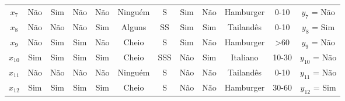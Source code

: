 \begin{center}
\begin{adjustbox}{max width=\textwidth}
\begin{tabular}{|cccccccccccc|}
        \multicolumn{1}{|c|}{${x_7}$}                     & \multicolumn{1}{|c|}{Não}          & \multicolumn{1}{|c|}{Sim} & \multicolumn{1}{|c|}{Não}         & \multicolumn{1}{|c|}{Não}  & \multicolumn{1}{|c|}{Ninguém}  & \multicolumn{1}{|c|}{S}     & \multicolumn{1}{|c|}{Sim}   & \multicolumn{1}{|c|}{Não}     & \multicolumn{1}{|c|}{Hamburger}  & \multicolumn{1}{|c|}{0-10}        & \multicolumn{1}{|c|}{$y_7$ = Não}                     \\ 
        \multicolumn{1}{|c|}{${x_8}$}                     & \multicolumn{1}{|c|}{Não}          & \multicolumn{1}{|c|}{Não} & \multicolumn{1}{|c|}{Não}         & \multicolumn{1}{|c|}{Sim}  & \multicolumn{1}{|c|}{Alguns}   & \multicolumn{1}{|c|}{SS}    & \multicolumn{1}{|c|}{Sim}   & \multicolumn{1}{|c|}{Sim}     & \multicolumn{1}{|c|}{Tailandês}  & \multicolumn{1}{|c|}{0-10}        & \multicolumn{1}{|c|}{$y_8$ = Sim}                     \\ 
        \multicolumn{1}{|c|}{${x_9}$}                     & \multicolumn{1}{|c|}{Não}          & \multicolumn{1}{|c|}{Sim} & \multicolumn{1}{|c|}{Sim}         & \multicolumn{1}{|c|}{Não}  & \multicolumn{1}{|c|}{Cheio}    & \multicolumn{1}{|c|}{S}     & \multicolumn{1}{|c|}{Sim}   & \multicolumn{1}{|c|}{Não}     & \multicolumn{1}{|c|}{Hamburger}  & \multicolumn{1}{|c|}{>60}         & \multicolumn{1}{|c|}{$y_9$ = Não}                     \\ 
        \multicolumn{1}{|c|}{${x_{10}}$}                    & \multicolumn{1}{|c|}{Sim}          & \multicolumn{1}{|c|}{Sim} & \multicolumn{1}{|c|}{Sim}         & \multicolumn{1}{|c|}{Sim}  & \multicolumn{1}{|c|}{Cheio}    & \multicolumn{1}{|c|}{SSS}   & \multicolumn{1}{|c|}{Não}   & \multicolumn{1}{|c|}{Sim}     & \multicolumn{1}{|c|}{Italiano}   & \multicolumn{1}{|c|}{10-30}       & \multicolumn{1}{|c|}{$y_{10}$ = Não}                  \\ 
        \multicolumn{1}{|c|}{$x_{11}$}                    & \multicolumn{1}{|c|}{Não}          & \multicolumn{1}{|c|}{Não} & \multicolumn{1}{|c|}{Não}         & \multicolumn{1}{|c|}{Não}  & \multicolumn{1}{|c|}{Ninguém}  & \multicolumn{1}{|c|}{S}     & \multicolumn{1}{|c|}{Não}   & \multicolumn{1}{|c|}{Não}     & \multicolumn{1}{|c|}{Tailandês}  & \multicolumn{1}{|c|}{0-10}        & \multicolumn{1}{|c|}{$y_{11}$ = Não}                  \\  
        \multicolumn{1}{|c|}{$x_{12}$}                    & \multicolumn{1}{|c|}{Sim}          & \multicolumn{1}{|c|}{Sim} & \multicolumn{1}{|c|}{Sim}         & \multicolumn{1}{|c|}{Sim}  & \multicolumn{1}{|c|}{Cheio}    & \multicolumn{1}{|c|}{S}     & \multicolumn{1}{|c|}{Não}   & \multicolumn{1}{|c|}{Não}     & \multicolumn{1}{|c|}{Hamburger}  & \multicolumn{1}{|c|}{30-60}       & \multicolumn{1}{|c|}{$y_{12}$ = Sim}                  \\ \hline
    \end{tabular}
    \end{adjustbox}
\end{center}
    
